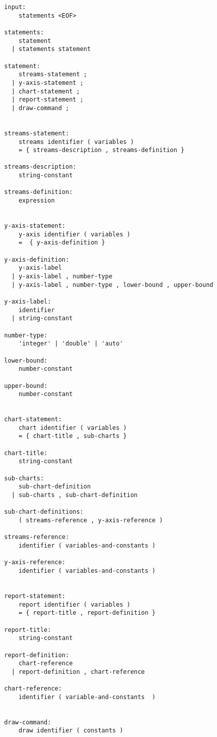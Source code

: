 \begin{verbatim}
  input:
      statements <EOF>
      
  statements:
      statement
    | statements statement
    
  statement: 
      streams-statement ;
    | y-axis-statement ;
    | chart-statement ;
    | report-statement ;
    | draw-command ;
   

  streams-statement:
      streams identifier ( variables )
      = { streams-description , streams-definition }
  
  streams-description:
      string-constant
  
  streams-definition:
      expression


  y-axis-statement:
      y-axis identifier ( variables )
      =  { y-axis-definition }
  
  y-axis-definition:
      y-axis-label
    | y-axis-label , number-type
    | y-axis-label , number-type , lower-bound , upper-bound
    
  y-axis-label:
      identifier
    | string-constant
    
  number-type:
      'integer' | 'double' | 'auto'
    
  lower-bound:
      number-constant
      
  upper-bound:
      number-constant
      
    
  chart-statement:
      chart identifier ( variables ) 
      = { chart-title , sub-charts }

  chart-title:
      string-constant
    
  sub-charts:
      sub-chart-definition
    | sub-charts , sub-chart-definition
    
  sub-chart-definitions:
      ( streams-reference , y-axis-reference )

  streams-reference:
      identifier ( variables-and-constants )

  y-axis-reference:
      identifier ( variables-and-constants )


  report-statement:
      report identifier ( variables ) 
      = { report-title , report-definition }

  report-title:
      string-constant

  report-definition:
      chart-reference 
    | report-definition , chart-reference

  chart-reference:
      identifier ( variable-and-constants  )
    
    
  draw-command:
      draw identifier ( constants )
      

\end{verbatim}
